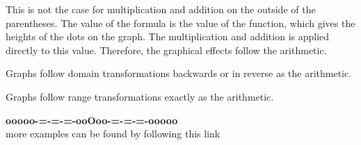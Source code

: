 \documentclass{ximera}
\begin{document}
This is not the case for multiplication and addition on the outside of the parentheses.  The value of the formula is the value of the function, which gives the heights of the dots on the graph.  The multiplication and addition is applied directly to this value.  Therefore, the graphical effects follow the arithmetic.


\begin{center}

Graphs follow domain transformations backwards or in reverse as the arithmetic.


\end{center}


\begin{center}

Graphs follow range transformations exactly as the arithmetic.


\end{center}













\begin{center}
\textbf{\textcolor{green!50!black}{ooooo-=-=-=-ooOoo-=-=-=-ooooo}} \\

more examples can be found by following this link\\ 

\end{center}
\end{document}
